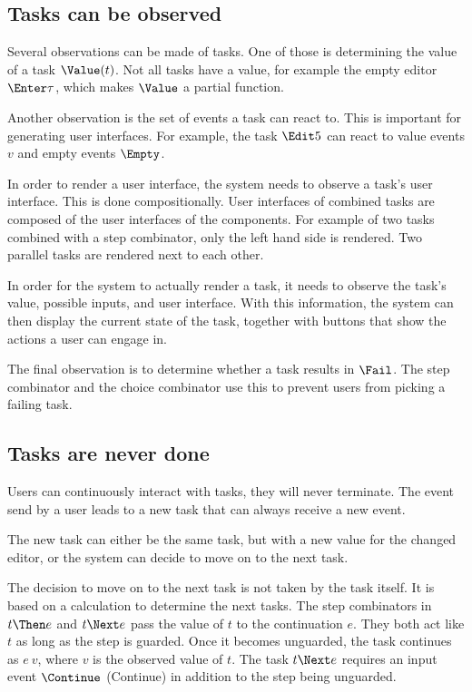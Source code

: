 \subsection{Tasks can be observed}

Several observations can be made of tasks.
One of those is determining the value of a task $\Value(t)$.
Not all tasks have a value, for example the empty editor $\Enter \tau$, which makes $\Value$ a partial function.

Another observation is the set of events a task can react to.
This is important for generating user interfaces.
For example, the task $\Edit 5$ can react to value events $v$ and empty events $\Empty$.

In order to render a user interface, the system needs to observe a task's user interface.
This is done compositionally.
User interfaces of combined tasks are composed of the user interfaces of the components.
For example of two tasks combined with a step combinator, only the left hand side is rendered.
Two parallel tasks are rendered next to each other.

In order for the system to actually render a task, it needs to observe the task's value, possible inputs, and user interface.
With this information, the system can then display the current state of the task, together with buttons that show the actions a user can engage in.

The final observation is to determine whether a task results in $\Fail$.
The step combinator and the choice combinator use this to prevent users from picking a failing task.


\subsection{Tasks are never done}

Users can continuously interact with tasks, they will never terminate. The event
send by a user leads to a new task that can always receive a new event.

The new task can either be the same task, but with a new value for the changed
editor, or the system can decide to move on to the next task.

The decision to move on to the next task is not taken by the task itself.
It is based on a calculation to determine the next tasks.
The step combinators in $t \Then e$ and $t \Next e$ pass the value of $t$ to the continuation $e$.
They both act like $t$ as long as the step is guarded.
Once it becomes unguarded, the task continues as $e\ v$, where $v$ is the observed value of $t$.
The task $t \Next e$ requires an input event $\Continue$ (Continue) in addition to the step being unguarded. %

